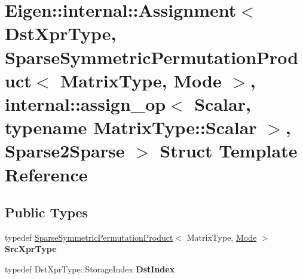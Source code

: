 \hypertarget{struct_eigen_1_1internal_1_1_assignment_3_01_dst_xpr_type_00_01_sparse_symmetric_permutation_pro69955201e4d84b32d17d1959c46119e9}{}\section{Eigen\+::internal\+::Assignment$<$ Dst\+Xpr\+Type, Sparse\+Symmetric\+Permutation\+Product$<$ Matrix\+Type, Mode $>$, internal\+::assign\+\_\+op$<$ Scalar, typename Matrix\+Type\+::Scalar $>$, Sparse2\+Sparse $>$ Struct Template Reference}
\label{struct_eigen_1_1internal_1_1_assignment_3_01_dst_xpr_type_00_01_sparse_symmetric_permutation_pro69955201e4d84b32d17d1959c46119e9}
\subsection*{Public Types}
\begin{DoxyCompactItemize}
\item 
\mbox{\label{struct_eigen_1_1internal_1_1_assignment_3_01_dst_xpr_type_00_01_sparse_symmetric_permutation_pro69955201e4d84b32d17d1959c46119e9_a27237deaf69ded2cfef08d699c0303cc}} 
typedef \mbox{\hyperlink{class_eigen_1_1_sparse_symmetric_permutation_product}{Sparse\+Symmetric\+Permutation\+Product}}$<$ Matrix\+Type, \mbox{\hyperlink{struct_mode}{Mode}} $>$ {\bfseries Src\+Xpr\+Type}
\item 
\mbox{\label{struct_eigen_1_1internal_1_1_assignment_3_01_dst_xpr_type_00_01_sparse_symmetric_permutation_pro69955201e4d84b32d17d1959c46119e9_ab03c962995ac3213c9ebb3eced4aba88}} 
typedef Dst\+Xpr\+Type\+::\+Storage\+Index {\bfseries Dst\+Index}
\end{DoxyCompactItemize}
